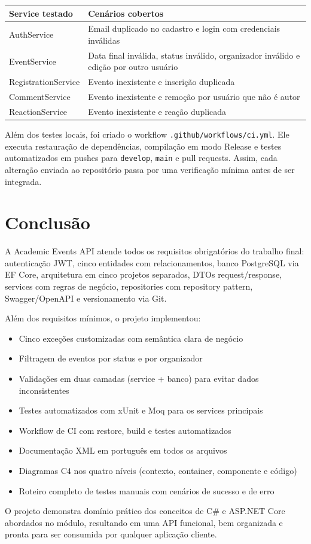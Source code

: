 \documentclass[11pt, a4paper, oneside]{article}
\begin{document}
\begin{longtable}{L{4cm} L{10.5cm}}
\toprule
{}
\color{white}\textbf{Service testado} & \color{white}\textbf{Cenários cobertos} \\
\midrule
\endhead
AuthService & Email duplicado no cadastro e login com credenciais inválidas \\
EventService & Data final inválida, status inválido, organizador inválido e edição por outro usuário \\
RegistrationService & Evento inexistente e inscrição duplicada \\
CommentService & Evento inexistente e remoção por usuário que não é autor \\
ReactionService & Evento inexistente e reação duplicada \\
\bottomrule
\end{longtable}

Além dos testes locais, foi criado o workflow \texttt{.github/workflows/ci.yml}. Ele executa restauração de dependências, compilação em modo Release e testes automatizados em pushes para \texttt{develop}, \texttt{main} e pull requests. Assim, cada alteração enviada ao repositório passa por uma verificação mínima antes de ser integrada.

\section{Conclusão}

A Academic Events API atende todos os requisitos obrigatórios do trabalho final: autenticação JWT, cinco entidades com relacionamentos, banco PostgreSQL via EF Core, arquitetura em cinco projetos separados, DTOs request/response, services com regras de negócio, repositories com repository pattern, Swagger/OpenAPI e versionamento via Git.

Além dos requisitos mínimos, o projeto implementou:

\begin{itemize}[noitemsep]
  \item Cinco exceções customizadas com semântica clara de negócio
  \item Filtragem de eventos por status e por organizador
  \item Validações em duas camadas (service + banco) para evitar dados inconsistentes
  \item Testes automatizados com xUnit e Moq para os services principais
  \item Workflow de CI com restore, build e testes automatizados
  \item Documentação XML em português em todos os arquivos
  \item Diagramas C4 nos quatro níveis (contexto, container, componente e código)
  \item Roteiro completo de testes manuais com cenários de sucesso e de erro
\end{itemize}

O projeto demonstra domínio prático dos conceitos de C\# e ASP.NET Core abordados no módulo, resultando em uma API funcional, bem organizada e pronta para ser consumida por qualquer aplicação cliente.
\end{document}
